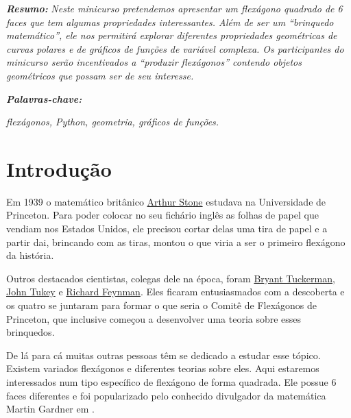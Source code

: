 \documentclass[12pt,oneside,a4paper]{article}
\begin{document}
\noindent \textit{\textbf{Resumo:}}{\it 
  Neste minicurso pretendemos apresentar um flexágono quadrado de 6 faces que tem algumas propriedades interessantes. Além de ser um ``brinquedo matemático'', ele nos permitirá explorar diferentes propriedades geométricas de curvas polares e de gráficos de funções de variável complexa. Os participantes do minicurso serão incentivados a ``produzir flexágonos'' contendo objetos geométricos que possam ser de seu interesse.}

\begin{flushleft}
\textit{\textbf{Palavras-chave:}}{\it
flexágonos, Python, geometria, gráficos de funções.

}\end{flushleft}

 






\section{Introdução}

Em 1939 o matemático britânico \href{https://en.wikipedia.org/wiki/Arthur_Harold_Stone}{Arthur Stone} estudava na Universidade de Princeton. Para poder colocar no seu fichário inglês as folhas de papel que vendiam nos Estados Unidos, ele precisou cortar delas uma tira de papel e a partir dai, brincando com as tiras, montou o que viria a ser o primeiro flexágono da história.

Outros destacados cientistas, colegas dele na época, foram \href{https://en.wikipedia.org/wiki/Bryant_Tuckerman}{Bryant Tuckerman}, \href{https://pt.wikipedia.org/wiki/John_Tukey}{John Tukey}  e  \href{https://pt.wikipedia.org/wiki/Richard\_Feynman}{Richard Feynman}. Eles ficaram entusiasmados com a descoberta e os quatro se juntaram para formar o que seria o Comitê de Flexágonos de Princeton, que inclusive começou a desenvolver uma teoria sobre esses brinquedos.

De lá para cá muitas outras pessoas têm se dedicado a estudar esse tópico. Existem variados flexágonos e diferentes teorias sobre eles. Aqui estaremos interessados num tipo específico de flexágono de forma quadrada. Ele possue 6 faces diferentes e foi popularizado pelo conhecido divulgador da matemática Martin Gardner em \cite{gardner1988}.
\end{document}
